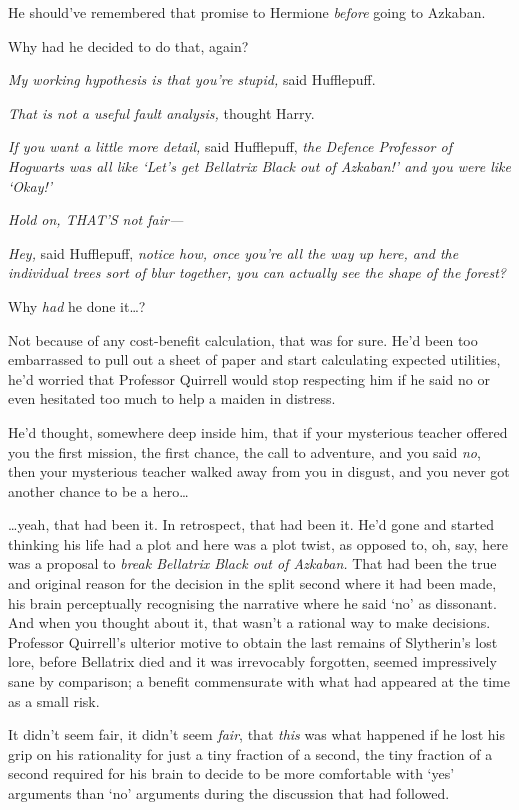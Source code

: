 He should've remembered that promise to Hermione \emph{before} going to
Azkaban.

Why had he decided to do that, again?

\emph{My working hypothesis is that you're stupid,} said Hufflepuff.

\emph{That is not a useful fault analysis,} thought Harry.

\emph{If you want a little more detail,} said Hufflepuff, \emph{the
Defence Professor of Hogwarts was all like `Let's get Bellatrix Black
out of Azkaban!' and you were like `Okay!'}

\emph{Hold on, THAT'S not fair---}

\emph{Hey,} said Hufflepuff, \emph{notice how, once you're all the way
up here, and the individual trees sort of blur together, you can
actually see the shape of the forest?}

Why \emph{had} he done it\ldots{}?

Not because of any cost-benefit calculation, that was for sure. He'd
been too embarrassed to pull out a sheet of paper and start calculating
expected utilities, he'd worried that Professor Quirrell would stop
respecting him if he said no or even hesitated too much to help a maiden
in distress.

He'd thought, somewhere deep inside him, that if your mysterious teacher
offered you the first mission, the first chance, the call to adventure,
and you said \emph{no}, then your mysterious teacher walked away from
you in disgust, and you never got another chance to be a hero\ldots{}

\ldots{}yeah, that had been it. In retrospect, that had been it. He'd
gone and started thinking his life had a plot and here was a plot twist,
as opposed to, oh, say, here was a proposal to \emph{break Bellatrix
Black out of Azkaban.} That had been the true and original reason for
the decision in the split second where it had been made, his brain
perceptually recognising the narrative where he said `no' as dissonant.
And when you thought about it, that wasn't a rational way to make
decisions. Professor Quirrell's ulterior motive to obtain the last
remains of Slytherin's lost lore, before Bellatrix died and it was
irrevocably forgotten, seemed impressively sane by comparison; a benefit
commensurate with what had appeared at the time as a small risk.

It didn't seem fair, it didn't seem \emph{fair}, that \emph{this} was
what happened if he lost his grip on his rationality for just a tiny
fraction of a second, the tiny fraction of a second required for his
brain to decide to be more comfortable with `yes' arguments than `no'
arguments during the discussion that had followed.

